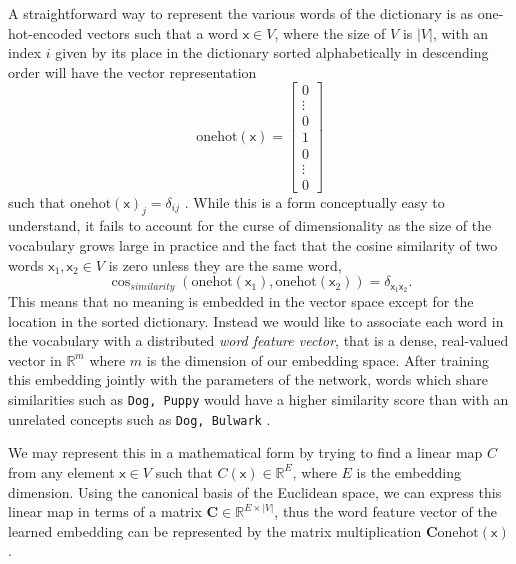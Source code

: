 A straightforward way to represent the various words of the dictionary is as
one-hot-encoded vectors such that a word $\mathsf{x} \in V$, where the size of
$V$ is $|V|$, with an index $i$ given by its place in the dictionary sorted
alphabetically in descending order will have the vector representation
\begin{equation}
  \label{eq:one_hot_encoding}
  \text{onehot}(\mathsf{x}) =
  \begin{bmatrix}
    0 \\
    \vdots \\
    0 \\
    1 \\
    0 \\
    \vdots \\
    0
  \end{bmatrix}
\end{equation}
such that $\text{onehot}(\mathsf{x})_j = \delta_{ij}$ \cite[p.~6]{goldberg2015primer}.
While this is a form conceptually easy to understand, it fails to account for the
curse of dimensionality as the size of the vocabulary grows large in practice
and the fact that the cosine similarity of two words $\mathsf{x}_1,
\mathsf{x}_2 \in V$ is zero unless they are the same word,
\begin{equation}
  \label{eq:cosine_similarity}
  \cos_{similarity}(\text{onehot}(\mathsf{x}_1), \text{onehot}(\mathsf{x}_2)) = \delta_{\mathsf{x}_1 \mathsf{x}_2}.
\end{equation} This means that no meaning is embedded in the vector space
except for the location in the sorted dictionary. Instead we would like to
associate each word in the vocabulary with a distributed \textit{word feature
  vector}, that is a dense, real-valued vector in $\mathbb{R}^m$ where $m$ is the
dimension of our embedding space. After training this embedding jointly with the
parameters of the network, words which share similarities such as \texttt{Dog,
  Puppy} would have a higher similarity score than with an unrelated concepts such as
\texttt{Dog, Bulwark} \cite{Bengio:2003:NPL:944919.944966}.

We may represent this in a mathematical form by trying to find a linear map $C$
from any element $\mathsf{x} \in V$ such that $C(\mathsf{x}) \in \mathbb{R}^E$,
where $E$ is the embedding dimension.
Using the canonical basis of the Euclidean space, we can express this
linear map in terms of a matrix $\bm{C} \in \mathbb{R}^{E \times |V|}$, thus the
word feature vector of the learned embedding can be represented by the matrix
multiplication $\bm{C} \text{onehot}(\mathsf{x})$.

